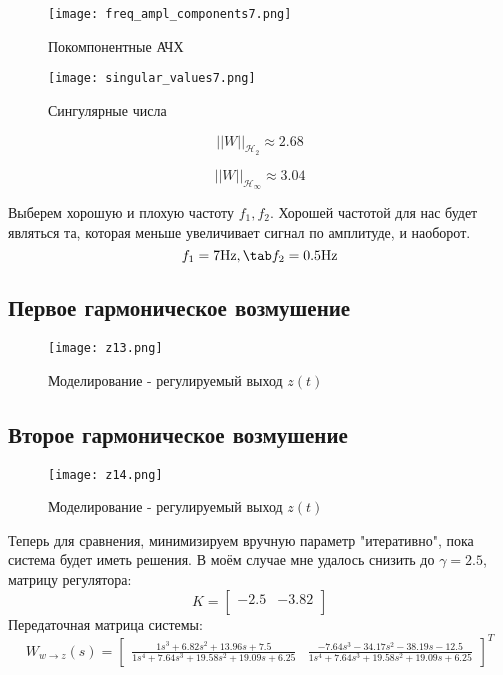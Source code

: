 \begin{figure}[ht]
    \centering
    \texttt{[image: freq\_ampl\_components7.png]}
    \caption{Покомпонентные АЧХ}
  \end{figure}
\newpage
\begin{figure}[ht]
  \centering
  \texttt{[image: singular\_values7.png]}
  \caption{Сингулярные числа}
\end{figure}

$$
    ||W||_{\mathcal{H}_2} \approx 2.68
$$

$$
    ||W||_{\mathcal{H}_\infty} \approx 3.04
$$

Выберем хорошую и плохую частоту $f_1, f_2$. 
Хорошей частотой для нас будет являться та, которая меньше увеличивает сигнал по амплитуде, и наоборот.
$$
    f_1 = 7 \text{Hz}, \tab f_2 = 0.5 \text{Hz}
$$

\newpage
\subsection{Первое гармоническое возмушение}
\begin{figure}[ht]
    \centering
    \texttt{[image: z13.png]}
    \caption{Моделирование -  регулируемый выход $z(t)$}
  \end{figure}
\newpage
\subsection{Второе гармоническое возмушение}
\begin{figure}[ht]
    \centering
    \texttt{[image: z14.png]}
    \caption{Моделирование -  регулируемый выход $z(t)$}
  \end{figure}


Теперь для сравнения, минимизируем вручную параметр "итеративно", пока система будет иметь решения.
В моём случае мне удалось снизить до $\gamma = 2.5$, матрицу регулятора: 
$$
    K = \begin{bmatrix}
        -2.5 & -3.82 \\
    \end{bmatrix}
$$
Передаточная матрица системы:
$$
    W_{w\rightarrow z}(s) = \begin{bmatrix}\frac{1s^{3} + 6.82s^{2} + 13.96s + 7.5}{1s^{4} + 7.64s^{3} + 19.58s^{2} + 19.09s + 6.25} &  \frac{-7.64s^{3} - 34.17s^{2} - 38.19s - 12.5}{1s^{4} + 7.64s^{3} + 19.58s^{2} + 19.09s + 6.25} \end{bmatrix}^T
$$

